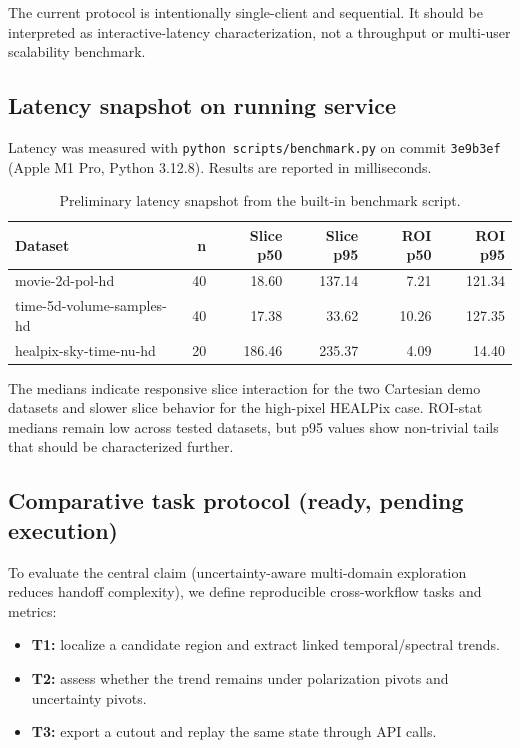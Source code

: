 \documentclass[11pt]{article}
\begin{document}
The current protocol is intentionally single-client and sequential. It should be interpreted as interactive-latency characterization, not a throughput or multi-user scalability benchmark.

\subsection{Latency snapshot on running service}
Latency was measured with \texttt{python scripts/benchmark.py} on commit \texttt{3e9b3ef} (Apple M1 Pro, Python 3.12.8). Results are reported in milliseconds.

\begin{table}[t]
  \centering
  \small
  \begin{tabular}{lrrrrr}
    \toprule
    Dataset & n & Slice p50 & Slice p95 & ROI p50 & ROI p95 \\
    \midrule
    movie-2d-pol-hd & 40 & 18.60 & 137.14 & 7.21 & 121.34 \\
    time-5d-volume-samples-hd & 40 & 17.38 & 33.62 & 10.26 & 127.35 \\
    healpix-sky-time-nu-hd & 20 & 186.46 & 235.37 & 4.09 & 14.40 \\
    \bottomrule
  \end{tabular}
  \caption{Preliminary latency snapshot from the built-in benchmark script.}
  \label{tab:latency}
\end{table}

The medians indicate responsive slice interaction for the two Cartesian demo datasets and slower slice behavior for the high-pixel HEALPix case. ROI-stat medians remain low across tested datasets, but p95 values show non-trivial tails that should be characterized further.

\subsection{Comparative task protocol (ready, pending execution)}
To evaluate the central claim (uncertainty-aware multi-domain exploration reduces handoff complexity), we define reproducible cross-workflow tasks and metrics:
\begin{itemize}[leftmargin=1.5em]
  \item \textbf{T1:} localize a candidate region and extract linked temporal/spectral trends.
  \item \textbf{T2:} assess whether the trend remains under polarization pivots and uncertainty pivots.
  \item \textbf{T3:} export a cutout and replay the same state through API calls.
\end{itemize}
\end{document}
